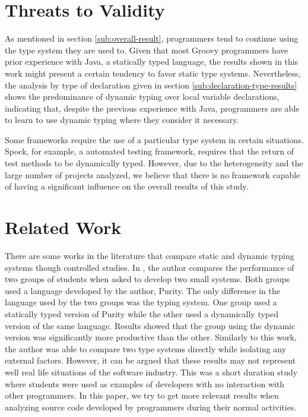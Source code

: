 \documentclass[preprint]{sigplanconf}
\begin{document}
\section{Threats to Validity\label{sec:ameaca}}
As mentioned in section \ref{sub:overall-result}, programmers tend to continue using the type system they are used to.
Given that most Groovy programmers have prior experience with Java, a statically typed language, the results shown in this work might present a certain tendency to favor static type systems. 
Nevertheless, the analysis by type of declaration given in section \ref{sub:declaration-type-results} shows the predominance of dynamic typing over local variable declarations, indicating that, despite the previous experience with Java,
programmers are able to learn to use dynamic typing where they consider it necessary.

Some frameworks require the use of a particular type system in certain situations. 
Spock, for example, a automated testing framework, requires that the return of test methods to be dynamically typed. 
However, due to the heterogeneity and the large number of projects analyzed, we believe that there is no framework capable of having a significant influence on the overall results of this study.

\section{Related Work\label{sec:Trabalhos-Relacionados}}
There are some works in the literature that compare static and dynamic typing systems though controlled studies.
In \cite{experiment_with_purity}, the author compares the performance of two groups of students when asked to develop two small systems. 
Both groups used a language developed by the author, Purity. 
The only difference in the language used by the two groups was the typing system.
One group used a statically typed version of Purity while the other used a dynamically typed version of the same language.
Results showed that the group using the dynamic version was significantly more productive than the other. 
Similarly to this work, the author was able to compare two type systems directly while isolating any external factors. 
However, it can be argued that these results may not represent well real life situations of the software industry. 
This was a short duration study where students were used as examples of developers with no interaction with other programmers. 
In this paper, we try to get more relevant results when analyzing source code developed by programmers during their normal activities.
\end{document}

